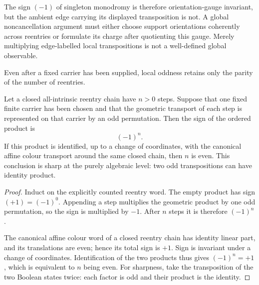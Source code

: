 The sign $(-1)$ of singleton monodromy is therefore orientation-gauge
invariant, but the ambient edge carrying its displayed transposition is not.
A global noncancellation argument must either choose support orientations
coherently across reentries or formulate its charge after quotienting this
gauge.  Merely multiplying edge-labelled local transpositions is not a
well-defined global observable.

Even after a fixed carrier has been supplied, local oddness retains only the
parity of the number of reentries.

\begin{lemma}
\label{lem:closed-intrinsic-reentry-parity-boundary}
Let a closed all-intrinsic reentry chain have $n>0$ steps.  Suppose that one
fixed finite carrier has been chosen and that the geometric transport of each
step is represented on that carrier by an odd permutation.  Then the sign of
the ordered product is
\[
  (-1)^n.
\]
If this product is identified, up to a change of coordinates, with the
canonical affine colour transport around the same closed chain, then $n$ is
even.  This conclusion is sharp at the purely algebraic level: two odd
transpositions can have identity product.

\end{lemma}

\begin{proof}
Induct on the explicitly counted reentry word.  The empty product has sign
$(+1)=(-1)^0$.  Appending a step multiplies the geometric product by one
odd permutation, so the sign is multiplied by $-1$.  After $n$ steps it
is therefore $(-1)^n$.

The canonical affine colour word of a closed reentry chain has identity
linear part, and its translations are even; hence its total sign is $+1$.
Sign is invariant under a change of coordinates.  Identification of the two
products thus gives $(-1)^n=+1$, which is equivalent to $n$ being even.
For sharpness, take the transposition of the two Boolean states twice: each
factor is odd and their product is the identity.
\end{proof}

